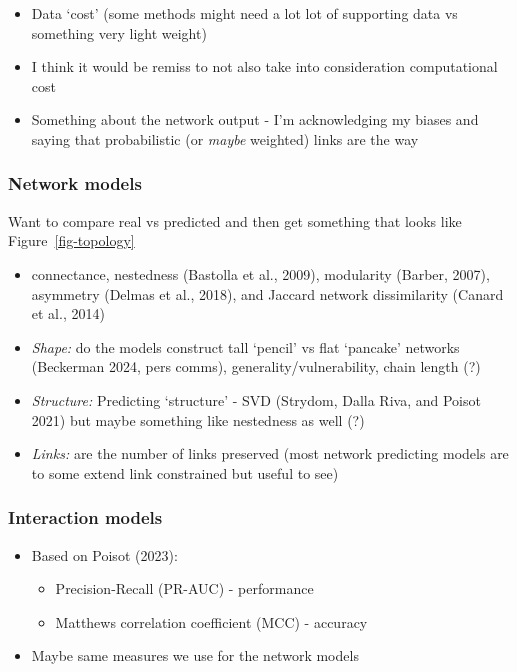 \documentclass[
  letterpaper,
  DIV=11,
  numbers=noendperiod]{scrartcl}
\providecommand{\tightlist}{%
  \setlength{\itemsep}{0pt}\setlength{\parskip}{0pt}}\usepackage{longtable,booktabs,array}
\begin{document}
\begin{itemize}
\tightlist
\item
  Data `cost' (some methods might need a lot lot of supporting data vs
  something very light weight)
\item
  I think it would be remiss to not also take into consideration
  computational cost
\item
  Something about the network output - I'm acknowledging my biases and
  saying that probabilistic (or \emph{maybe} weighted) links are the way
\end{itemize}

\subsubsection{Network models}\label{network-models}

Want to compare real vs predicted and then get something that looks like
Figure~\ref{fig-topology}

\begin{itemize}
\item
  connectance, nestedness (Bastolla et al., 2009), modularity (Barber,
  2007), asymmetry (Delmas et al., 2018), and Jaccard network
  dissimilarity (Canard et al., 2014)
\item
  \emph{Shape:} do the models construct tall `pencil' vs flat `pancake'
  networks (Beckerman 2024, pers comms), generality/vulnerability, chain
  length (?)
\item
  \emph{Structure:} Predicting `structure' - SVD (Strydom, Dalla Riva,
  and Poisot 2021) but maybe something like nestedness as well (?)
\item
  \emph{Links:} are the number of links preserved (most network
  predicting models are to some extend link constrained but useful to
  see)
\end{itemize}

\subsubsection{Interaction models}\label{interaction-models}

\begin{itemize}
\tightlist
\item
  Based on Poisot (2023):

  \begin{itemize}
  \tightlist
  \item
    Precision-Recall (PR-AUC) - performance
  \item
    Matthews correlation coefficient (MCC) - accuracy
  \end{itemize}
\item
  Maybe same measures we use for the network models
\end{itemize}
\end{document}
